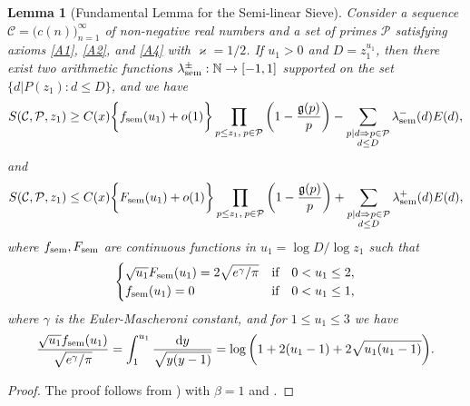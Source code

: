 \documentclass[12pt]{amsart}
\numberwithin{equation}{section}
\newtheorem{lemma}[theorem]{Lemma}
\theoremstyle{remark}
\theoremstyle{definition}
\begin{document}
\begin{lemma}[Fundamental Lemma for the Semi-linear Sieve]\label{fundsemi}
Consider a sequence $\mathcal{C}=\big(c(n)\big)_{n=1}^\infty$ of non-negative real numbers and a set of primes $\mathcal{P}$ satisfying axioms \ref{A1}, \ref{A2}, and \ref{A4} with $\varkappa = 1/2$. If $u_1>0$ and $D=z_1^{u_1}$, then there exist two arithmetic functions $\lambda^\pm_{\textup{sem}}: \mathbb{N}\rightarrow [-1, 1]$ supported on the set $\{d|P(z_1): d\leq D\}$, and we have 
\begin{equation}\label{lower}
S(\mathcal{C}, \mathcal{P}, z_1) \geq C(x)\bigg\{f_{\textup{sem}}(u_1) + o(1)\bigg\}\prod_{p\leq z_1,\: p\in \mathcal{P}}\bigg(1-\dfrac{\mathfrak{g}(p)}{p}\bigg) - \sum_{\substack{p|d \Rightarrow p \in \mathcal{P}\\ d\leq D}}\lambda^-_{\textup{sem}}(d){E}(d),
\end{equation}
and
\begin{equation}
\label{upper} S(\mathcal{C}, \mathcal{P}, z_1) \leq C(x)\bigg\{F_{\textup{sem}}(u_1) + o(1)\bigg\}\prod_{p\leq z_1,\: p\in \mathcal{P}}\bigg(1-\dfrac{\mathfrak{g}(p)}{p}\bigg)+\sum_{\substack{p|d \Rightarrow p \in \mathcal{P}\\ d\leq D}}\lambda^+_{\textup{sem}}(d){E}(d),
\end{equation}
where $f_{\textup{sem}}, F_{\textup{sem}}$ are continuous functions in $u_1 = \log D/\log z_1$ such that 
\begin{equation}
\begin{cases} \label{s}
\sqrt{u_1}F_{\textup{sem}}(u_1)=2\sqrt{e^\gamma/\pi} & \text{if}\quad 0 <u_1 \leq 2, \\ 
f_{\textup{sem}}(u_1) = 0 & \text{if}\quad 0<u_1\leq 1, 
\end{cases}
\end{equation}
where $\gamma$ is the Euler-Mascheroni constant, and 
for $1\leq u_1\leq 3$ we have
\begin{equation}\label{fsem}
\dfrac{\sqrt{u_1}f_{\textup{sem}}(u_1)}{\sqrt{e^\gamma/\pi}}=\int_1^{u_1} \dfrac{\textup{d}y}{\sqrt{y(y-1)}}=\log \bigg(1+2(u_1-1)+2\sqrt{u_1(u_1-1)}\bigg).
\end{equation}
\end{lemma}
\begin{proof}
The proof follows from \cite[Theorem 11.12--Theorem 11.13 ]{opera}) with $\beta=1$ and \cite[Chapter 14 (pp. 275--276)]{opera}.
\end{proof}
\end{document}
